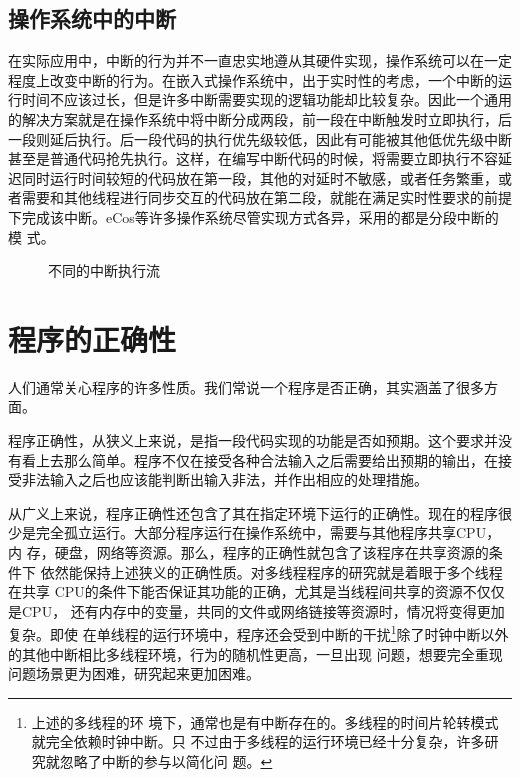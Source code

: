 \subsection{操作系统中的中断}
\label{subsec:intr_OS}
在实际应用中，中断的行为并不一直忠实地遵从其硬件实现，操作系统可以在一定
程度上改变中断的行为。在嵌入式操作系统中，出于实时性的考虑，一个中断的运
行时间不应该过长，但是许多中断需要实现的逻辑功能却比较复杂。因此一个通用
的解决方案就是在操作系统中将中断分成两段，前一段在中断触发时立即执行，后
一段则延后执行。后一段代码的执行优先级较低，因此有可能被其他低优先级中断
甚至是普通代码抢先执行。这样，在编写中断代码的时候，将需要立即执行不容延
迟同时运行时间较短的代码放在第一段，其他的对延时不敏感，或者任务繁重，或
者需要和其他线程进行同步交互的代码放在第二段，就能在满足实时性要求的前提
下完成该中断。eCos等许多操作系统尽管实现方式各异，采用的都是分段中断的模
式。\cite{ecos}

\begin{figure}
	\centering
	{}
	{}
	\caption{不同的中断执行流}
	\label{fig:two_intr_exec}
\end{figure}

\section{程序的正确性}
\label{sec:correctness}
人们通常关心程序的许多性质。我们常说一个程序是否正确，其实涵盖了很多方面。

程序正确性，从狭义上来说，是指一段代码实现的功能是否如预期。这个要求并没
有看上去那么简单。程序不仅在接受各种合法输入之后需要给出预期的输出，在接
受非法输入之后也应该能判断出输入非法，并作出相应的处理措施。

从广义上来说，程序正确性还包含了其在指定环境下运行的正确性。现在的程序很
少是完全孤立运行。大部分程序运行在操作系统中，需要与其他程序共享CPU，内
存，硬盘，网络等资源。那么，程序的正确性就包含了该程序在共享资源的条件下
依然能保持上述狭义的正确性质。对多线程程序的研究就是着眼于多个线程在共享
CPU的条件下能否保证其功能的正确，尤其是当线程间共享的资源不仅仅是CPU，
还有内存中的变量，共同的文件或网络链接等资源时，情况将变得更加复杂。即使
在单线程的运行环境中，程序还会受到中断的干扰\footnote{上述的多线程的环
境下，通常也是有中断存在的。多线程的时间片轮转模式就完全依赖时钟中断。只
不过由于多线程的运行环境已经十分复杂，许多研究就忽略了中断的参与以简化问
题。}除了时钟中断以外的其他中断相比多线程环境，行为的随机性更高，一旦出现
问题，想要完全重现问题场景更为困难，研究起来更加困难。

